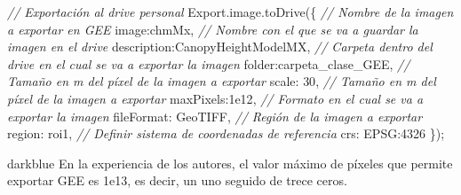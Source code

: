 \documentclass[
  12pt,
  letterpaper,
  twoside]{book}
\newenvironment{Shaded}{\begin{snugshade}}{\end{snugshade}}
\newcommand{\AttributeTok}[1]{\textcolor[rgb]{0.48,0.12,0.64}{#1}}
\newcommand{\CommentTok}[1]{\textcolor[rgb]{0.24,0.58,0.00}{\textit{#1}}}
\newcommand{\DataTypeTok}[1]{\textcolor[rgb]{0.00,0.00,0.00}{#1}}
\newcommand{\DecValTok}[1]{\textcolor[rgb]{0.28,0.53,0.93}{#1}}
\newcommand{\FloatTok}[1]{\textcolor[rgb]{0.28,0.53,0.93}{#1}}
\newcommand{\FunctionTok}[1]{\textcolor[rgb]{0.48,0.12,0.64}{#1}}
\newcommand{\NormalTok}[1]{#1}
\newcommand{\OperatorTok}[1]{\textcolor[rgb]{0.00,0.00,0.00}{#1}}
\newcommand{\StringTok}[1]{\textcolor[rgb]{0.87,0.29,0.22}{#1}}
\begin{document}
\begin{Shaded}
\begin{Highlighting}[]
\CommentTok{// Exportación al drive personal}
\NormalTok{Export}\OperatorTok{.}\AttributeTok{image}\OperatorTok{.}\FunctionTok{toDrive}\NormalTok{(\{}
  \CommentTok{// Nombre de la imagen a exportar en GEE}
  \DataTypeTok{image}\OperatorTok{:}\NormalTok{chmMx}\OperatorTok{,} 
  \CommentTok{// Nombre con el que se va a guardar la imagen en el drive}
  \DataTypeTok{description}\OperatorTok{:}\StringTok{\textquotesingle{}CanopyHeightModelMX\textquotesingle{}}\OperatorTok{,}
  \CommentTok{// Carpeta dentro del drive en el cual se va a exportar la imagen}
  \DataTypeTok{folder}\OperatorTok{:}\StringTok{\textquotesingle{}carpeta\_clase\_GEE\textquotesingle{}}\OperatorTok{,}
  \CommentTok{// Tamaño en m del píxel de la imagen a exportar}
  \DataTypeTok{scale}\OperatorTok{:} \DecValTok{30}\OperatorTok{,}
  \CommentTok{// Tamaño en m del píxel de la imagen a exportar}
  \DataTypeTok{maxPixels}\OperatorTok{:}\FloatTok{1e12}\OperatorTok{,}
  \CommentTok{// Formato en el cual se va a exportar la imagen}
  \DataTypeTok{fileFormat}\OperatorTok{:} \StringTok{\textquotesingle{}GeoTIFF\textquotesingle{}}\OperatorTok{,}
  \CommentTok{// Región de la imagen a exportar}
  \DataTypeTok{region}\OperatorTok{:}\NormalTok{ roi1}\OperatorTok{,}
  \CommentTok{// Definir sistema de coordenadas de referencia}
  \DataTypeTok{crs}\OperatorTok{:} \StringTok{\textquotesingle{}EPSG:4326\textquotesingle{}}
\NormalTok{\})}\OperatorTok{;}
\end{Highlighting}
\end{Shaded}

\begin{bluebox2}

\begin{awesomeblock}{5pt}{\faLightbulb}{darkblue}
En la experiencia de los autores, el valor máximo de píxeles que permite exportar GEE es 1e13, es decir, un uno seguido de trece ceros.

\end{awesomeblock}

\end{bluebox2}
\end{document}
